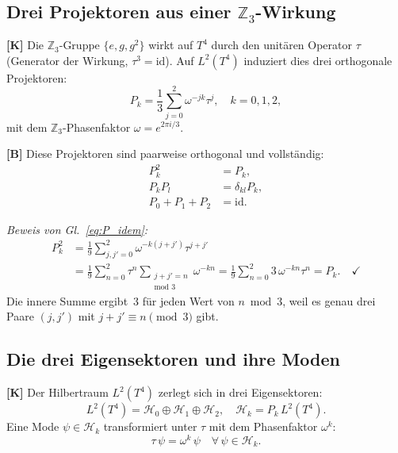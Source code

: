 \subsection{Drei Projektoren aus einer $\mathbb{Z}_3$-Wirkung}

\textbf{[K]} Die $\mathbb{Z}_3$-Gruppe $\{e, g, g^2\}$ wirkt auf
$T^4$ durch den unitären Operator $\tau$ (Generator der Wirkung,
$\tau^3 = \mathrm{id}$). Auf $L^2(T^4)$ induziert dies drei
orthogonale Projektoren:
\begin{equation}
  P_k = \frac{1}{3}\sum_{j=0}^{2} \omega^{-jk}\tau^j,
  \quad k = 0, 1, 2,
  \label{eq:projek}
\end{equation}
mit dem $\mathbb{Z}_3$-Phasenfaktor $\omega = e^{2\pi i/3}$.

\textbf{[B]} Diese Projektoren sind paarweise orthogonal und vollständig:
\begin{align}
  P_k^2 &= P_k, \label{eq:P_idem}\\
  P_k P_l &= \delta_{kl} P_k, \label{eq:P_orth}\\
  P_0 + P_1 + P_2 &= \mathrm{id}. \label{eq:P_vollst}
\end{align}

\emph{Beweis von Gl.~\eqref{eq:P_idem}:}
\begin{align}
  P_k^2 &= \frac{1}{9}\sum_{j,j'=0}^{2}
            \omega^{-k(j+j')}\tau^{j+j'} \nonumber \\
         &= \frac{1}{9}\sum_{n=0}^{2}\tau^n
            \sum_{\substack{j+j'=n \\ \text{mod }3}}
            \omega^{-kn}
         = \frac{1}{9}\sum_{n=0}^{2} 3\,\omega^{-kn}\tau^n
         = P_k. \quad\checkmark
\end{align}
Die innere Summe ergibt~3 für jeden Wert von $n \bmod 3$, weil es genau
drei Paare $(j,j')$ mit $j+j' \equiv n \pmod{3}$ gibt.

\subsection{Die drei Eigensektoren und ihre Moden}

\textbf{[K]} Der Hilbertraum $L^2(T^4)$ zerlegt sich in drei
Eigensektoren:
\begin{equation}
  L^2(T^4) = \mathcal{H}_0 \oplus \mathcal{H}_1 \oplus \mathcal{H}_2,
  \quad \mathcal{H}_k = P_k\,L^2(T^4).
  \label{eq:zerleg}
\end{equation}
Eine Mode $\psi \in \mathcal{H}_k$ transformiert unter $\tau$ mit
dem Phasenfaktor $\omega^k$:
\begin{equation}
  \tau\,\psi = \omega^k\,\psi \quad \forall\,\psi \in \mathcal{H}_k.
  \label{eq:eigenphase}
\end{equation}

